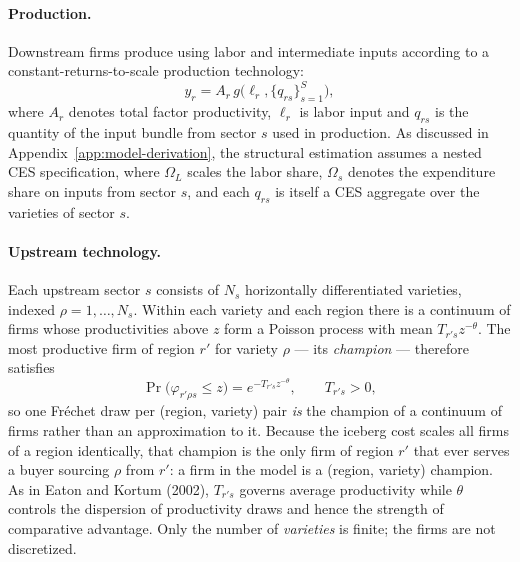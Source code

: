 \paragraph{Production.} Downstream firms produce using labor and intermediate inputs according
to a constant-returns-to-scale production technology:
\begin{equation}
y_{r}=A_{r}\,g\big(\ell_{r},\{q_{rs}\}_{s=1}^{S}\big),
\label{eq:downstream-tech}
\end{equation}
where $A_{r}$ denotes total factor productivity, $\ell_{r}$ is labor input and $q_{rs}$ is the
quantity of the input bundle from sector $s$ used in production. As discussed in
Appendix~\ref{app:model-derivation}, the structural estimation assumes a nested CES
specification, where $\Omega_{L}$ scales the labor share, $\Omega_{s}$ denotes the expenditure
share on inputs from sector $s$, and each $q_{rs}$ is itself a CES aggregate over the varieties
of sector $s$.

\paragraph{Upstream technology.} Each upstream sector $s$ consists of $N_{s}$ horizontally
differentiated varieties, indexed $\rho=1,\dots,N_{s}$. Within each variety and each region
there is a continuum of firms whose productivities above $z$ form a Poisson process with mean
$T_{r's}z^{-\theta}$. The most productive firm of region $r'$ for variety $\rho$ --- its
\emph{champion} --- therefore satisfies
\begin{equation}
\Pr\big(\varphi_{r'\rho s}\le z\big)=e^{-T_{r's}z^{-\theta}},
\qquad T_{r's}>0,
\label{eq:frechet}
\end{equation}
so one Fr\'echet draw per (region, variety) pair \emph{is} the champion of a continuum of
firms rather than an approximation to it. Because the iceberg cost scales all firms of a region
identically, that champion is the only firm of region $r'$ that ever serves a buyer sourcing
$\rho$ from $r'$: a firm in the model is a (region, variety) champion. As in Eaton and Kortum
(2002), $T_{r's}$ governs average productivity while $\theta$ controls the dispersion of
productivity draws and hence the strength of comparative advantage. Only the number of
\emph{varieties} is finite; the firms are not discretized.

